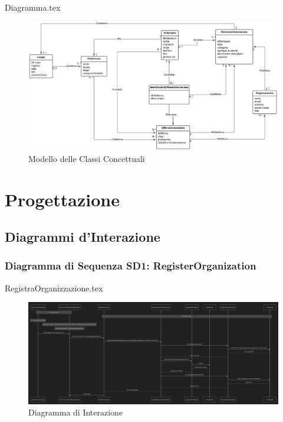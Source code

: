 \documentclass[12pt]{article}
\begin{document}
{Diagramma.tex}
\begin{figure}[H]
    \includegraphics[width=1.17\textwidth, height=\textheight,keepaspectratio]{Immagini/ModellazioneDiBusiness/Iterazione 1/Diagramma.png}
        \caption{Modello delle Classi Concettuali}
        \label{fig:Modello delle Classi Concettuali 1}
\end{figure}

\section{Progettazione}
\subsection{Diagrammi d'Interazione}

\subsubsection{Diagramma di Sequenza SD1: RegisterOrganization}
{RegistraOrganizzazione.tex}

\begin{figure}[H]
    \includegraphics[width=\textwidth, height=\textheight,keepaspectratio]{Immagini/SD/Iterazione 1/SDRegistraOrganizzazione.png}
        \caption{Diagramma di Interazione}
        \label{fig:diagrammaSD1}
\end{figure}
\end{document}
